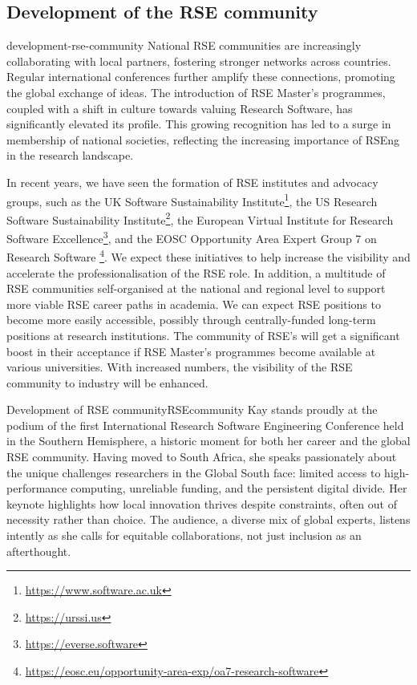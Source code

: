 \documentclass{eceasst}
\begin{document}
\subsection{Development of the RSE community}
\begin{whatis}{}{development-rse-community}
National RSE communities are increasingly collaborating with local partners, fostering stronger networks across countries. Regular international conferences further amplify these connections, promoting the global exchange of ideas. The introduction of RSE Master's programmes, coupled with a shift in culture towards valuing Research Software, has significantly elevated its profile. This growing recognition has led to a surge in membership of national societies, reflecting the increasing importance of RSEng in the research landscape.
\end{whatis}
In recent years, we have seen the formation of RSE institutes and advocacy groups, such as
the UK Software Sustainability Institute\footnote{\url{https://www.software.ac.uk}},
the US Research Software Sustainability Institute\footnote{\url{https://urssi.us}},
the European Virtual Institute for Research Software Excellence\footnote{\url{https://everse.software}},
and the EOSC Opportunity Area Expert Group 7 on Research Software%
\footnote{\url{https://eosc.eu/opportunity-area-exp/oa7-research-software}}.
We expect these initiatives to help increase the visibility and accelerate
the professionalisation%
of the RSE role.
In addition, a multitude of RSE communities self-organised at the national
and regional level to support more viable RSE career paths in academia.
We can expect RSE positions to become more easily accessible, possibly through centrally-funded long-term positions at research institutions.
The community of RSE's will get a significant boost in their acceptance if RSE Master's programmes
become available at various universities.
With increased numbers, the visibility of the RSE community to industry will be enhanced.
\begin{story}{Development of RSE community}{RSEcommunity}
Kay stands proudly at the podium of the first International Research Software Engineering Conference held in the Southern Hemisphere, a historic moment for both her career and the global RSE community. Having moved to South Africa, she speaks passionately about the unique challenges researchers in the Global South face: limited access to high-performance computing, unreliable funding, and the persistent digital divide. Her keynote highlights how local innovation thrives despite constraints, often out of necessity rather than choice. The audience, a diverse mix of global experts, listens intently as she calls for equitable collaborations, not just inclusion as an afterthought.
\end{story}
\end{document}
